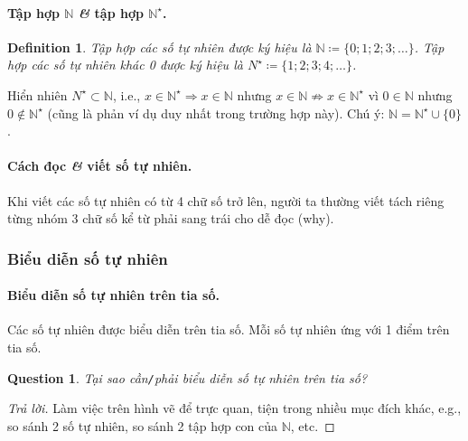 \documentclass{article}
\numberwithin{equation}{section}
\newtheorem{definition}{Definition}[section]
\newtheorem{question}{Question}[section]
\begin{document}
\paragraph{Tập hợp $\mathbb{N}$ \textit{\&} tập hợp $\mathbb{N}^\star$.}
\begin{definition}
	\emph{Tập hợp các số tự nhiên} được ký hiệu là $\mathbb{N}\coloneqq\{0;1;2;3;\ldots\}$. \emph{Tập hợp các số tự nhiên khác 0} được ký hiệu là $N^\star\coloneqq\{1;2;3;4;\ldots\}$.
\end{definition}
Hiển nhiên $N^\star\subset\mathbb{N}$, i.e., $x\in\mathbb{N}^\star\Rightarrow x\in\mathbb{N}$ nhưng $x\in\mathbb{N}\not\Rightarrow x\in\mathbb{N}^\star$ vì $0\in\mathbb{N}$ nhưng $0\notin\mathbb{N}^\star$ (cũng là phản ví dụ duy nhất trong trường hợp này). Chú ý: $\mathbb{N} = \mathbb{N}^\star\cup\{0\}$.

\paragraph{Cách đọc \textit{\&} viết số tự nhiên.} Khi viết các số tự nhiên có từ 4 chữ số trở lên, người ta thường viết tách riêng từng nhóm 3 chữ số kể từ phải sang trái cho dễ đọc (why).

\subsubsection{Biểu diễn số tự nhiên}

\paragraph{Biểu diễn số tự nhiên trên tia số.} Các số tự nhiên được biểu diễn trên tia số. Mỗi số tự nhiên ứng với 1 điểm trên tia số.

\begin{question}
	Tại sao cần\emph{\texttt{/}}phải biểu diễn số tự nhiên trên tia số?
\end{question}

\begin{proof}[Trả lời]
	Làm việc trên hình vẽ để trực quan, tiện trong nhiều mục đích khác, e.g., so sánh 2 số tự nhiên, so sánh 2 tập hợp con của $\mathbb{N}$, etc.
\end{proof}
\end{document}
